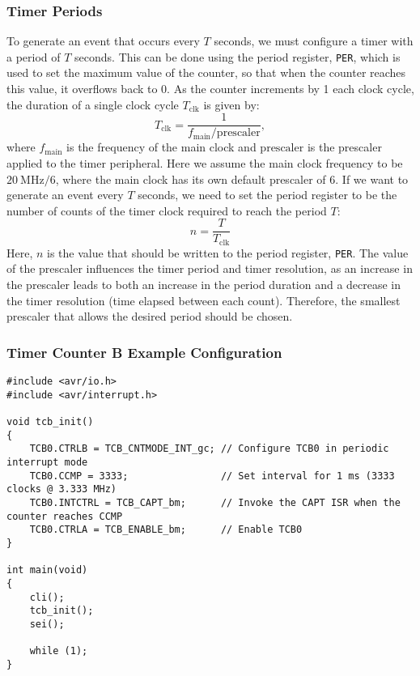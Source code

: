 \documentclass{article}
\begin{document}
\subsubsection{Timer Periods}
To generate an event that occurs every \(T\) seconds, we must configure
a timer with a period of \(T\) seconds. This can be done using the
period register, \texttt{PER}, which is used to set the maximum
value of the counter, so that when the counter reaches this value, it
overflows back to 0. As the counter increments by 1 each clock cycle,
the duration of a single clock cycle \(T_\mathrm{clk}\) is given by:
\begin{equation*}
    T_\mathrm{clk} = \frac{1}{f_\mathrm{main} / \mathrm{prescaler}},
\end{equation*}
where \(f_\mathrm{main}\) is the frequency of the main clock and
\(\mathrm{prescaler}\) is the prescaler applied to the timer peripheral.
Here we assume the main clock frequency to be \(\qty{20}{\mega\hertz}/6\),
where the main clock has its own default prescaler of 6. If we
want to generate an event every \(T\) seconds, we need to set the period
register to be the number of counts of the timer clock required to reach
the period \(T\):
\begin{equation*}
    n = \frac{T}{T_\mathrm{clk}}
\end{equation*}
Here, \(n\) is the value that should be written to the period register,
\texttt{PER}. The value of the prescaler influences the timer
period and timer resolution, as an increase in the prescaler leads to
both an increase in the period duration and a decrease in the timer
resolution (time elapsed between each count). Therefore, the smallest
prescaler that allows the desired period should be chosen.
\subsubsection{Timer Counter B Example Configuration}
\begin{verbatim}
#include <avr/io.h>
#include <avr/interrupt.h>

void tcb_init()
{
    TCB0.CTRLB = TCB_CNTMODE_INT_gc; // Configure TCB0 in periodic interrupt mode
    TCB0.CCMP = 3333;                // Set interval for 1 ms (3333 clocks @ 3.333 MHz)
    TCB0.INTCTRL = TCB_CAPT_bm;      // Invoke the CAPT ISR when the counter reaches CCMP
    TCB0.CTRLA = TCB_ENABLE_bm;      // Enable TCB0
}

int main(void)
{
    cli();
    tcb_init();
    sei();

    while (1);
}
\end{verbatim}
\end{document}
